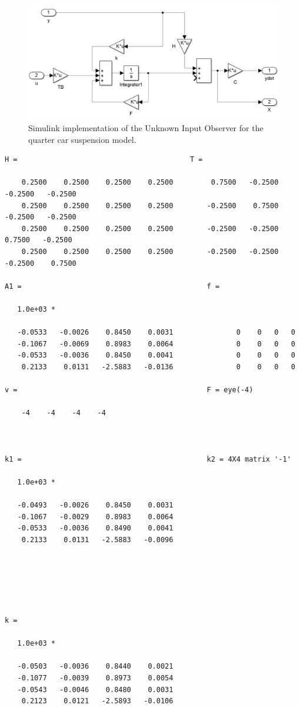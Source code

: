 \documentclass{amsart}
\theoremstyle{definition}
\theoremstyle{remark}
\numberwithin{equation}{section}
\begin{document}
\begin{figure}[H]
    \centering
    \includegraphics[scale=.45]{carSusUIO.png}
    \caption{Simulink implementation of the Unknown Input Observer for the quarter car suspension model.}
    \label{fig:carSusUIO}
\end{figure}
        \color{lightgray} \begin{verbatim}
H =                                         T =

    0.2500    0.2500    0.2500    0.2500         0.7500   -0.2500   -0.2500   -0.2500
    0.2500    0.2500    0.2500    0.2500        -0.2500    0.7500   -0.2500   -0.2500
    0.2500    0.2500    0.2500    0.2500        -0.2500   -0.2500    0.7500   -0.2500
    0.2500    0.2500    0.2500    0.2500        -0.2500   -0.2500   -0.2500    0.7500

A1 =                                            f =

   1.0e+03 *

   -0.0533   -0.0026    0.8450    0.0031               0    0   0   0
   -0.1067   -0.0069    0.8983    0.0064               0    0   0   0
   -0.0533   -0.0036    0.8450    0.0041               0    0   0   0
    0.2133    0.0131   -2.5883   -0.0136               0    0   0   0

v =                                             F = eye(-4)

    -4    -4    -4    -4



k1 =                                            k2 = 4X4 matrix '-1'

   1.0e+03 *

   -0.0493   -0.0026    0.8450    0.0031
   -0.1067   -0.0029    0.8983    0.0064
   -0.0533   -0.0036    0.8490    0.0041
    0.2133    0.0131   -2.5883   -0.0096






k =

   1.0e+03 *

   -0.0503   -0.0036    0.8440    0.0021
   -0.1077   -0.0039    0.8973    0.0054
   -0.0543   -0.0046    0.8480    0.0031
    0.2123    0.0121   -2.5893   -0.0106

\end{verbatim} \color{black}
\end{document}
